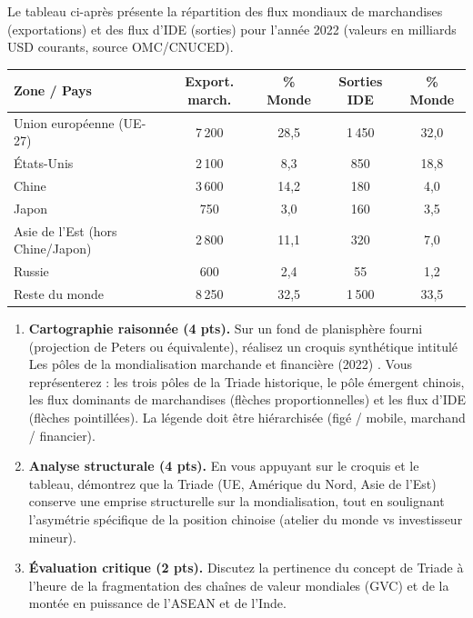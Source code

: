 \documentclass[11pt]{article}
\begin{document}
\begin{exercice}
\noindent Le tableau ci-après présente la répartition des flux mondiaux de marchandises (exportations) et des flux d'IDE (sorties) pour l'année 2022 (valeurs en milliards USD courants, source OMC/CNUCED).

\begin{center}
\begin{tabular}{lcccc}
\toprule
\textbf{Zone / Pays} & \textbf{Export. march.} & \textbf{\% Monde} & \textbf{Sorties IDE} & \textbf{\% Monde} \\
\midrule
Union européenne (UE-27) & 7\,200 & 28,5 & 1\,450 & 32,0 \\
États-Unis & 2\,100 & 8,3 & 850 & 18,8 \\
Chine & 3\,600 & 14,2 & 180 & 4,0 \\
Japon & 750 & 3,0 & 160 & 3,5 \\
Asie de l'Est (hors Chine/Japon) & 2\,800 & 11,1 & 320 & 7,0 \\
Russie & 600 & 2,4 & 55 & 1,2 \\
Reste du monde & 8\,250 & 32,5 & 1\,500 & 33,5 \\
\bottomrule
\end{tabular}
\end{center}

\begin{enumerate}
\item \textbf{Cartographie raisonnée (4 pts).} Sur un fond de planisphère fourni (projection de Peters ou équivalente), réalisez un croquis synthétique intitulé \og Les pôles de la mondialisation marchande et financière (2022) \fg. Vous représenterez : les trois pôles de la Triade historique, le pôle émergent chinois, les flux dominants de marchandises (flèches proportionnelles) et les flux d'IDE (flèches pointillées). La légende doit être hiérarchisée (figé / mobile, marchand / financier).
\item \textbf{Analyse structurale (4 pts).} En vous appuyant sur le croquis et le tableau, démontrez que la Triade (UE, Amérique du Nord, Asie de l'Est) conserve une emprise structurelle sur la mondialisation, tout en soulignant l'asymétrie spécifique de la position chinoise (atelier du monde vs investisseur mineur).
\item \textbf{Évaluation critique (2 pts).} Discutez la pertinence du concept de \og Triade \fg à l'heure de la fragmentation des chaînes de valeur mondiales (GVC) et de la montée en puissance de l'ASEAN et de l'Inde.
\end{enumerate}
\end{exercice}
\end{document}
